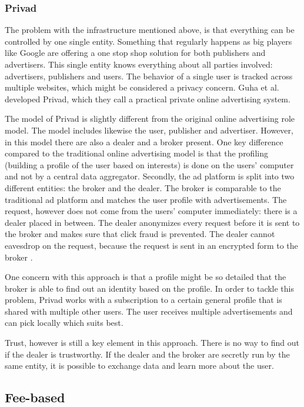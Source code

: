 \subsubsection{Privad}
\label{sec:privad}
The problem with the infrastructure mentioned above, is that everything can be controlled by one single entity. Something that regularly happens as big players like Google are offering a one stop shop solution for both publishers and advertisers. This single entity knows everything about all parties involved: advertisers, publishers and users. The behavior of a single user is tracked across multiple websites, which might be considered a privacy concern. Guha et al. \cite{guha2011privad} developed Privad, which they call a practical private online advertising system.

The model of Privad is slightly different from the original online advertising role model. The model includes likewise the user, publisher and advertiser. However, in this model there are also a dealer and a broker present. One key difference compared to the traditional online advertising model is that the profiling (building a profile of the user based on interests) is done on the users' computer and not by a central data aggregator. Secondly, the ad platform is split into two different entities: the broker and the dealer. The broker is comparable to the traditional ad platform and matches the user profile with advertisements. The request, however does not come from the users' computer immediately: there is a dealer placed in between. The dealer anonymizes every request before it is sent to the broker and makes sure that click fraud is prevented. The dealer cannot eavesdrop on the request, because the request is sent in an encrypted form to the broker \cite{guha2011privad}.

One concern with this approach is that a profile might be so detailed that the broker is able to find out an identity based on the profile. In order to tackle this problem, Privad works with a subscription to a certain general profile that is shared with multiple other users. The user receives multiple advertisements and can pick locally which suits best.

Trust, however is still a key element in this approach. There is no way to find out if the dealer is trustworthy. If the dealer and the broker are secretly run by the same entity, it is possible to exchange data and learn more about the user.

\subsection{Fee-based}

